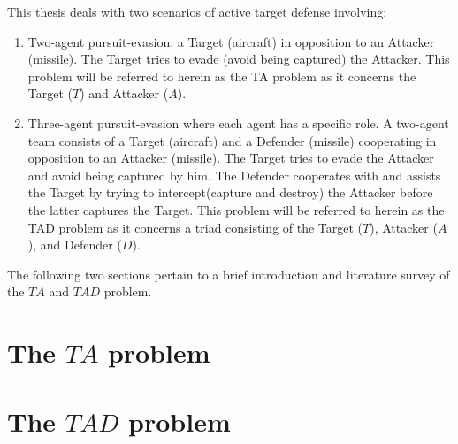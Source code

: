 % 
%
%
%

This thesis deals with two scenarios of active target defense involving:
\begin{enumerate}
	\item Two-agent pursuit-evasion: a Target (aircraft) in opposition to an Attacker (missile). The Target tries to evade (avoid being captured) the Attacker. This problem will be referred to herein as the TA problem as it concerns the Target ($T$) and Attacker ($A$).
	\item Three-agent pursuit-evasion where each agent has a specific role.
	A two-agent team consists of a Target (aircraft) and a Defender (missile) cooperating in opposition to an Attacker (missile).
	The Target tries to evade the Attacker and avoid being captured by him.
	The Defender cooperates with and assists the Target by trying to intercept(capture and destroy) the Attacker before the latter captures the Target.
	This problem will be referred to herein as the TAD problem as it concerns a triad consisting of the Target ($T$), Attacker ($A$), and Defender ($D$).
\end{enumerate}


The following two sections pertain to a brief introduction and literature survey of the $ TA $ and $ TAD $ problem.

\section{The $ TA $ problem}


\section{The $ TAD $ problem}

